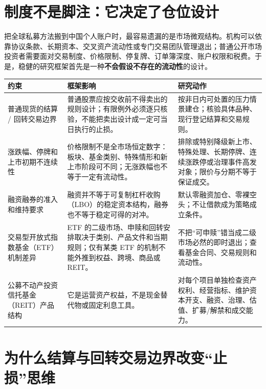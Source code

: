 \section{制度不是脚注：它决定了仓位设计}

把全球私募方法搬到中国个人账户时，最容易遗漏的是市场微观结构。机构可以依靠协议条款、长期资本、交叉资产流动性或专门交易团队管理退出；普通公开市场投资者需要面对交易制度、价格限制、停复牌、订单簿深度、账户权限和税费。于是，稳健的研究框架首先是一种\textbf{不会假设不存在的流动性}的设计。

\begin{exhibitbox}
\small
\begin{tabularx}{\exhibitboxwidth}{L{3.0cm} X L{4.1cm}}
\toprule
\textbf{约束} & \textbf{框架影响} & \textbf{研究动作} \\
\midrule
普通现货的结算 / 回转交易边界 & 普通股票应按交收前不得卖出的规则设计；有限例外必须逐只核验，不能把卖出设计成一定可当日执行的止损。 & 按非日内可处置的压力情景建仓；核验具体品种、现行登记结算和交易规则。 \\
涨跌幅、停牌和上市初期不连续性 & 价格限制不是全市场恒定数字：板块、基金类别、特殊情形和新上市阶段可不同；无涨跌幅也不等于一定有流动性。 & 排除或特别降级新上市、特殊处理、长期停牌、连续涨跌停或治理事件高发对象；限价与分期不等于保证成交。 \\
融资融券的准入和维持要求 & 融资并不等于可复制杠杆收购（LBO）的稳定资本结构，融券也不等于稳定可得的对冲。 & 默认零融资加仓、零裸空头；不让借款成为策略成立条件。 \\
交易型开放式指数基金（ETF）机制差异 & ETF 的二级市场、申赎和回转安排取决于类别、产品文件和当期规则；仅有某类 ETF 的机制不能外推到权益、跨境、商品或 REIT。 & 不把“可申赎”错当成二级市场必然的即时退出；查看基金合同、交易规则和流动性。 \\
公募不动产投资信托基金（REIT）产品结构 & 它是运营资产权益，不是现金替代物或固定利息工具。 & 对每个项目单独检查资产权利、经营指标、维护资本开支、融资、治理、估值、扩募/解禁和成交能力。 \\
\bottomrule
\end{tabularx}
\end{exhibitbox}

\section{为什么结算与回转交易边界改变“止损”思维}

